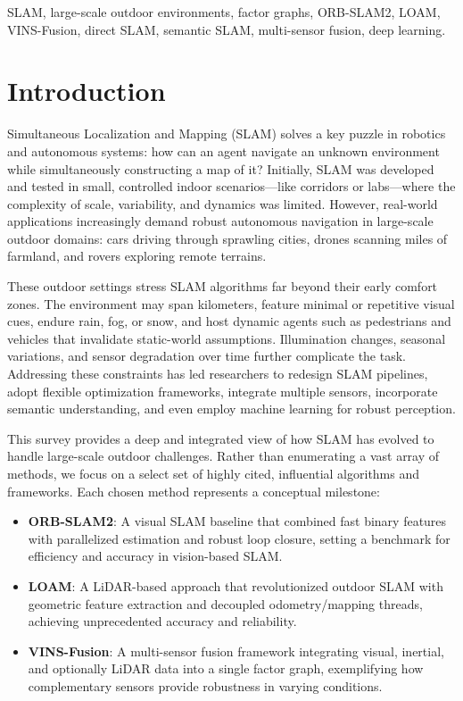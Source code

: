 \documentclass[conference]{IEEEtran}
\begin{document}
\begin{IEEEkeywords}
SLAM, large-scale outdoor environments, factor graphs, ORB-SLAM2, LOAM, VINS-Fusion, direct SLAM, semantic SLAM, multi-sensor fusion, deep learning.
\end{IEEEkeywords}

\section{Introduction}
Simultaneous Localization and Mapping (SLAM) solves a key puzzle in robotics and autonomous systems: how can an agent navigate an unknown environment while simultaneously constructing a map of it? Initially, SLAM was developed and tested in small, controlled indoor scenarios—like corridors or labs—where the complexity of scale, variability, and dynamics was limited. However, real-world applications increasingly demand robust autonomous navigation in large-scale outdoor domains: cars driving through sprawling cities, drones scanning miles of farmland, and rovers exploring remote terrains.

These outdoor settings stress SLAM algorithms far beyond their early comfort zones. The environment may span kilometers, feature minimal or repetitive visual cues, endure rain, fog, or snow, and host dynamic agents such as pedestrians and vehicles that invalidate static-world assumptions. Illumination changes, seasonal variations, and sensor degradation over time further complicate the task. Addressing these constraints has led researchers to redesign SLAM pipelines, adopt flexible optimization frameworks, integrate multiple sensors, incorporate semantic understanding, and even employ machine learning for robust perception.

This survey provides a deep and integrated view of how SLAM has evolved to handle large-scale outdoor challenges. Rather than enumerating a vast array of methods, we focus on a select set of highly cited, influential algorithms and frameworks. Each chosen method represents a conceptual milestone:

\begin{itemize}
    \item \textbf{ORB-SLAM2}: A visual SLAM baseline that combined fast binary features with parallelized estimation and robust loop closure, setting a benchmark for efficiency and accuracy in vision-based SLAM.
    \item \textbf{LOAM}: A LiDAR-based approach that revolutionized outdoor SLAM with geometric feature extraction and decoupled odometry/mapping threads, achieving unprecedented accuracy and reliability.
    \item \textbf{VINS-Fusion}: A multi-sensor fusion framework integrating visual, inertial, and optionally LiDAR data into a single factor graph, exemplifying how complementary sensors provide robustness in varying conditions.
\end{itemize}
\end{document}
